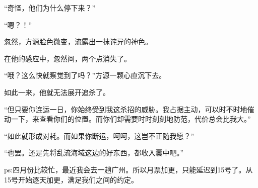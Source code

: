 \begin{this_body}
“奇怪，他们为什么停下来？”

“嗯？！”

忽然，方源脸色微变，流露出一抹诧异的神色。

在他的感应中，忽然间，两个点消失了。

“哦？这么快就察觉到了吗？”方源一颗心直沉下去。

如此一来，他就无法展开追杀了。

“但只要你连运一日，你始终受到我这杀招的威胁。我占据主动，可以时不时地催动一下，来查看你们的位置。而你们却需要时时刻刻地防范，代价总会比我大。”

“如此就形成对耗。而如果你断运，呵呵，这岂不正随我愿？”

“也罢。还是先将乱流海域这边的好东西，都收入囊中吧。”

ps:四月份比较忙，最近我会去一趟广州。所以月票加更，只能延迟到15号了。从15号开始逐天加更，满足我们之间的约定。

\end{this_body}


